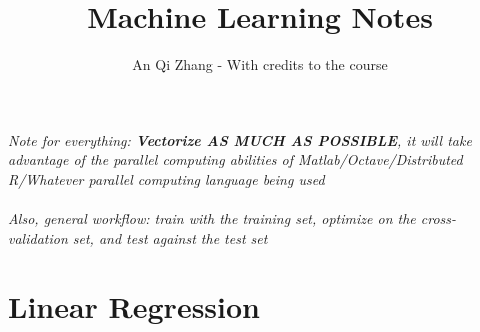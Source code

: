 \documentclass[]{article}
\begin{document}
\title{Machine Learning Notes}
\author{An Qi Zhang - With credits to the course}
\maketitle

\emph{Note for everything: \textbf{Vectorize AS MUCH AS POSSIBLE}, it will take advantage of the parallel computing abilities of Matlab/Octave/Distributed R/Whatever parallel computing language being used}
\\
\\
\emph{Also, general workflow: train with the training set, optimize on the cross-validation set, and test against the test set}
\section{Linear Regression}
\end{document}
